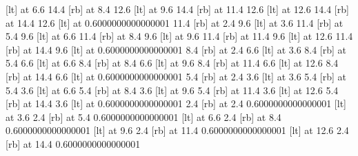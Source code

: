  [lt] at 6.6 14.4
 [rb] at 8.4 12.6
 [lt] at 9.6 14.4
 [rb] at 11.4 12.6
 [lt] at 12.6 14.4
 [rb] at 14.4 12.6
 [lt] at 0.6000000000000001 11.4
 [rb] at 2.4 9.6
 [lt] at 3.6 11.4
 [rb] at 5.4 9.6
 [lt] at 6.6 11.4
 [rb] at 8.4 9.6
 [lt] at 9.6 11.4
 [rb] at 11.4 9.6
 [lt] at 12.6 11.4
 [rb] at 14.4 9.6
 [lt] at 0.6000000000000001 8.4
 [rb] at 2.4 6.6
 [lt] at 3.6 8.4
 [rb] at 5.4 6.6
 [lt] at 6.6 8.4
 [rb] at 8.4 6.6
 [lt] at 9.6 8.4
 [rb] at 11.4 6.6
 [lt] at 12.6 8.4
 [rb] at 14.4 6.6
 [lt] at 0.6000000000000001 5.4
 [rb] at 2.4 3.6
 [lt] at 3.6 5.4
 [rb] at 5.4 3.6
 [lt] at 6.6 5.4
 [rb] at 8.4 3.6
 [lt] at 9.6 5.4
 [rb] at 11.4 3.6
 [lt] at 12.6 5.4
 [rb] at 14.4 3.6
 [lt] at 0.6000000000000001 2.4
 [rb] at 2.4 0.6000000000000001
 [lt] at 3.6 2.4
 [rb] at 5.4 0.6000000000000001
 [lt] at 6.6 2.4
 [rb] at 8.4 0.6000000000000001
 [lt] at 9.6 2.4
 [rb] at 11.4 0.6000000000000001
 [lt] at 12.6 2.4
 [rb] at 14.4 0.6000000000000001
\endpicture
\bigskip
\vfil\eject
\vfil\eject\bye

